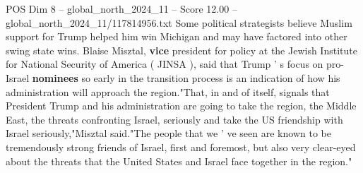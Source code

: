 \begin{textsample}{POS Dim 8 – global\_north\_2024\_11 – Score 12.00 – global\_north\_2024\_11/117814956.txt}
Some political strategists believe Muslim support for Trump helped him win Michigan and may have factored into other swing state wins.
Blaise Misztal, \textbf{vice} president for policy at the Jewish Institute for National Security of America ( JINSA ), said that Trump ' s focus on pro-Israel \textbf{nominees} so early in the transition process is an indication of how his administration will approach the region."That, in and of itself, signals that President Trump and his administration are going to take the region, the Middle East, the threats confronting Israel, seriously and take the US friendship with Israel seriously,"Misztal said."The people that we ' ve seen are known to be tremendously strong friends of Israel, first and foremost, but also very clear-eyed about the threats that the United States and Israel face together in the region."

\end{textsample}
